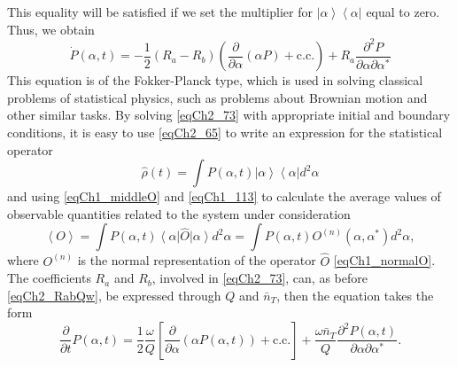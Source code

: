 This equality will be satisfied if we set the multiplier for  
$\left|\alpha\right>\left<\alpha\right|$ equal to zero. Thus, we obtain 
\begin{equation}
\dot{P}\left(\alpha, t\right) = 
-\frac{1}{2}\left(R_a - R_b\right)
\left(
\frac{\partial}{\partial \alpha}\left(\alpha P\right) + \text{c.c.}
\right)
+ R_a
\frac{\partial^2 P}{\partial \alpha \partial \alpha^{*}}
\label{eqCh2_73}
\end{equation}
This equation is of the Fokker-Planck type, which is used in solving classical problems of statistical physics, such as problems about Brownian motion and other similar tasks. By solving \eqref{eqCh2_73} with appropriate initial and boundary conditions, it is easy to use \eqref{eqCh2_65} to write an expression for the statistical operator 
\[
\hat{\rho}\left(t\right) = 
\int P\left(\alpha, t\right)
\left|\alpha\right>\left<\alpha\right| 
d^2 \alpha
\]
and using \eqref{eqCh1_middleO} and \eqref{eqCh1_113} to calculate the average values of observable quantities related to the system under consideration   
\[
\left<O\right>= \int P\left(\alpha, t\right) \left<\alpha\right|\hat{O}\left|\alpha\right>d^2
\alpha =
\int  P\left(\alpha, t\right)O^{\left(n\right)}\left(\alpha, \alpha^{*}\right)d^2\alpha,
\]
where $O^{\left(n\right)}$ is the normal representation of the operator $\hat{O}$ \eqref{eqCh1_normalO}.
The coefficients $R_a$ and  $R_b$, involved in \eqref{eqCh2_73}, can, as before \eqref{eqCh2_RabQw}, be expressed through $Q$  and $\bar{n}_T$, then the equation takes the form 
\begin{equation}
\frac{\partial}{\partial t}P\left(\alpha, t\right) = 
\frac{1}{2}\frac{\omega}{Q}\left[
\frac{\partial}{\partial \alpha}\left(
\alpha P\left(\alpha, t\right)
\right) + \text{c.c.}
\right]
+
\frac{\omega \bar{n}_T}{Q} \frac{\partial^2  P\left(\alpha,
  t\right)}{\partial \alpha \partial \alpha^{*}}.
\label{eqCh2_74}
\end{equation}

